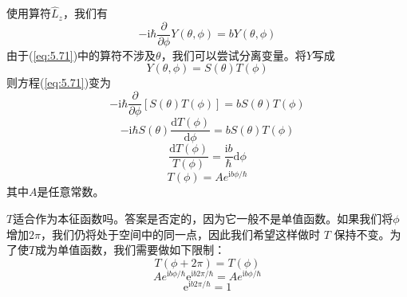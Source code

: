     使用算符$\hat{L}_z$，我们有
    \begin{equation}
        -\mathrm{i}\hbar\frac{\partial}{\partial \phi}Y\left(\theta,\phi\right) = bY\left(\theta,\phi\right)
        \label{eq:5.71}
    \end{equation}
    由于(\ref{eq:5.71})中的算符不涉及$\theta$，我们可以尝试分离变量。将$Y$写成
    \begin{equation}
        Y\left(\theta,\phi\right) = S\left(\theta\right)T\left(\phi\right)
        \label{eq:5.72}
    \end{equation}
    则方程(\ref{eq:5.71})变为
    \begin{equation*}
        -\mathrm{i}\hbar\frac{\partial}{\partial \phi}\left[S\left(\theta\right)T\left(\phi\right)\right] = bS\left(\theta\right)T\left(\phi\right)
    \end{equation*}
    \begin{equation*}
        -\mathrm{i}\hbar S\left(\theta\right)\frac{\mathrm{d}T\left(\phi\right)}{\mathrm{d}\phi} = bS\left(\theta\right)T\left(\phi\right)
    \end{equation*}
    \begin{equation*}
        \frac{\mathrm{d}T\left(\phi\right)}{T\left(\phi\right)} = \frac{\mathrm{i}b}{\hbar}\mathrm{d}\phi
    \end{equation*}
    \begin{equation}
        T\left(\phi\right) = A e^{\mathrm{i}b\phi/\hbar}
        \label{eq:5.73}
    \end{equation}
    其中$A$是任意常数。

    $T$适合作为本征函数吗。答案是否定的，因为它一般不是单值函数。如果我们将$\phi$增加$2\pi$，我们仍将处于空间中的同一点，因此我们希望这样做时 $T$ 保持不变。为了使$T$成为单值函数，我们需要做如下限制：
    \begin{equation*}
        T\left(\phi + 2\pi\right) = T\left(\phi\right)
    \end{equation*}
    \begin{equation*}
        A e^{\mathrm{i}b\phi/\hbar}\mathrm{e}^{\mathrm{i}b2\pi/\hbar} = A e^{\mathrm{i}b\phi/\hbar}
    \end{equation*}
    \begin{equation}
        \mathrm{e}^{\mathrm{i}b2\pi/\hbar} = 1
        \label{eq:5.74}
    \end{equation}

